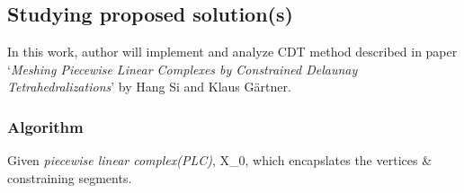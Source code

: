 \documentclass{article}
\begin{document}
\subsection{Studying proposed solution(s)}
In this work, author will implement and analyze CDT method described in paper `\textit{Meshing Piecewise Linear Complexes by Constrained Delaunay Tetrahedralizations}' by Hang Si and Klaus G{\"a}rtner.


\subsubsection{Algorithm}
Given \textit{piecewise linear complex(PLC)}, X_0, which encapslates the vertices & constraining segments.
\end{document}
